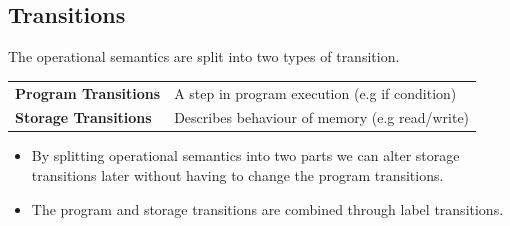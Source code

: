 \subsection{Transitions}
The operational semantics are split into two types of transition.
\begin{center}
    \begin{tabular}{l p{}}
        \textbf{Program Transitions} & A step in program execution (e.g if condition) \\
        \textbf{Storage Transitions} & Describes behaviour of memory (e.g read/write) \\
    \end{tabular}
\end{center}
\begin{itemize}
    \item By splitting operational semantics into two parts we can alter storage transitions later without having to change the program transitions.
    \item The program and storage transitions are combined through label transitions.
\end{itemize}

